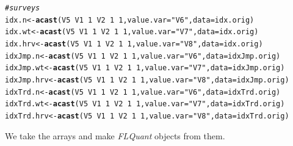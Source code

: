 \documentclass[a4paper,english,10pt]{article}\usepackage[]{graphicx}\usepackage[]{color}
\makeatletter
\newcommand{\hlnum}[1]{\textcolor[rgb]{0.686,0.059,0.569}{#1}}%
\newcommand{\hlstr}[1]{\textcolor[rgb]{0.192,0.494,0.8}{#1}}%
\newcommand{\hlcom}[1]{\textcolor[rgb]{0.678,0.584,0.686}{\textit{#1}}}%
\newcommand{\hlopt}[1]{\textcolor[rgb]{0,0,0}{#1}}%
\newcommand{\hlstd}[1]{\textcolor[rgb]{0.345,0.345,0.345}{#1}}%
\newcommand{\hlkwb}[1]{\textcolor[rgb]{0.69,0.353,0.396}{#1}}%
\newcommand{\hlkwc}[1]{\textcolor[rgb]{0.333,0.667,0.333}{#1}}%
\newcommand{\hlkwd}[1]{\textcolor[rgb]{0.737,0.353,0.396}{\textbf{#1}}}%
\newenvironment{kframe}{%
 \def\at@end@of@kframe{}%
 \ifinner\ifhmode%
  \def\at@end@of@kframe{\end{minipage}}%
  \begin{minipage}{\columnwidth}%
 \fi\fi%
 \def\FrameCommand##1{\hskip\@totalleftmargin \hskip-\fboxsep
 \colorbox{shadecolor}{##1}\hskip-\fboxsep
     \hskip-\linewidth \hskip-\@totalleftmargin \hskip\columnwidth}%
 \MakeFramed {\advance\hsize-\width
   \@totalleftmargin\z@ \linewidth\hsize
   \@setminipage}}%
 {\par\unskip\endMakeFramed%
 \at@end@of@kframe}
\newenvironment{knitrout}{}{} %
\newcommand{\class}[1]{{\textit{#1}}}
\makeatother
\begin{document}
\begin{knitrout}
\begin{kframe}
\begin{alltt}
\hlcom{# surveys}
\hlstd{idx.n} \hlkwb{<-} \hlkwd{acast}\hlstd{(V5} \hlopt{~} \hlstd{V1} \hlopt{~} \hlnum{1} \hlopt{~} \hlstd{V2} \hlopt{~} \hlnum{1} \hlopt{~} \hlnum{1}\hlstd{,} \hlkwc{value.var} \hlstd{=} \hlstr{"V6"}\hlstd{,} \hlkwc{data} \hlstd{= idx.orig)}
\hlstd{idx.wt} \hlkwb{<-} \hlkwd{acast}\hlstd{(V5} \hlopt{~} \hlstd{V1} \hlopt{~} \hlnum{1} \hlopt{~} \hlstd{V2} \hlopt{~} \hlnum{1} \hlopt{~} \hlnum{1}\hlstd{,} \hlkwc{value.var} \hlstd{=} \hlstr{"V7"}\hlstd{,} \hlkwc{data} \hlstd{= idx.orig)}
\hlstd{idx.hrv} \hlkwb{<-} \hlkwd{acast}\hlstd{(V5} \hlopt{~} \hlstd{V1} \hlopt{~} \hlnum{1} \hlopt{~} \hlstd{V2} \hlopt{~} \hlnum{1} \hlopt{~} \hlnum{1}\hlstd{,} \hlkwc{value.var} \hlstd{=} \hlstr{"V8"}\hlstd{,} \hlkwc{data} \hlstd{= idx.orig)}
\hlstd{idxJmp.n} \hlkwb{<-} \hlkwd{acast}\hlstd{(V5} \hlopt{~} \hlstd{V1} \hlopt{~} \hlnum{1} \hlopt{~} \hlstd{V2} \hlopt{~} \hlnum{1} \hlopt{~} \hlnum{1}\hlstd{,} \hlkwc{value.var} \hlstd{=} \hlstr{"V6"}\hlstd{,} \hlkwc{data} \hlstd{= idxJmp.orig)}
\hlstd{idxJmp.wt} \hlkwb{<-} \hlkwd{acast}\hlstd{(V5} \hlopt{~} \hlstd{V1} \hlopt{~} \hlnum{1} \hlopt{~} \hlstd{V2} \hlopt{~} \hlnum{1} \hlopt{~} \hlnum{1}\hlstd{,} \hlkwc{value.var} \hlstd{=} \hlstr{"V7"}\hlstd{,} \hlkwc{data} \hlstd{= idxJmp.orig)}
\hlstd{idxJmp.hrv} \hlkwb{<-} \hlkwd{acast}\hlstd{(V5} \hlopt{~} \hlstd{V1} \hlopt{~} \hlnum{1} \hlopt{~} \hlstd{V2} \hlopt{~} \hlnum{1} \hlopt{~} \hlnum{1}\hlstd{,} \hlkwc{value.var} \hlstd{=} \hlstr{"V8"}\hlstd{,} \hlkwc{data} \hlstd{= idxJmp.orig)}
\hlstd{idxTrd.n} \hlkwb{<-} \hlkwd{acast}\hlstd{(V5} \hlopt{~} \hlstd{V1} \hlopt{~} \hlnum{1} \hlopt{~} \hlstd{V2} \hlopt{~} \hlnum{1} \hlopt{~} \hlnum{1}\hlstd{,} \hlkwc{value.var} \hlstd{=} \hlstr{"V6"}\hlstd{,} \hlkwc{data} \hlstd{= idxTrd.orig)}
\hlstd{idxTrd.wt} \hlkwb{<-} \hlkwd{acast}\hlstd{(V5} \hlopt{~} \hlstd{V1} \hlopt{~} \hlnum{1} \hlopt{~} \hlstd{V2} \hlopt{~} \hlnum{1} \hlopt{~} \hlnum{1}\hlstd{,} \hlkwc{value.var} \hlstd{=} \hlstr{"V7"}\hlstd{,} \hlkwc{data} \hlstd{= idxTrd.orig)}
\hlstd{idxTrd.hrv} \hlkwb{<-} \hlkwd{acast}\hlstd{(V5} \hlopt{~} \hlstd{V1} \hlopt{~} \hlnum{1} \hlopt{~} \hlstd{V2} \hlopt{~} \hlnum{1} \hlopt{~} \hlnum{1}\hlstd{,} \hlkwc{value.var} \hlstd{=} \hlstr{"V8"}\hlstd{,} \hlkwc{data} \hlstd{= idxTrd.orig)}
\end{alltt}
\end{kframe}
\end{knitrout}


We take the arrays and make \class{FLQuant} objects from them.
\end{document}
